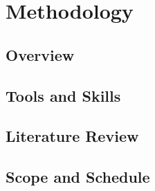 \section{Methodology}
\subsection{Overview}



\subsection{Tools and Skills}



\newpage
\subsection{Literature Review}


\subsection{Scope and Schedule}
